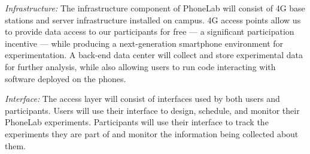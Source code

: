 \emph{Infrastructure:} The infrastructure component of
PhoneLab will consist of 4G base stations and server infrastructure installed
on campus. 4G access points allow us to provide data access to our
participants for free --- a significant participation incentive --- while
producing a next-generation smartphone environment for experimentation. A
back-end data center will collect and store experimental data for further
analysis, while also allowing users to run code interacting with software
deployed on the phones.

\emph{Interface:} The access layer will consist of interfaces used
by both users and participants. Users will use their interface to design,
schedule, and monitor their PhoneLab experiments. Participants will use
their interface to track the experiments they are part of and monitor the
information being collected about them.


